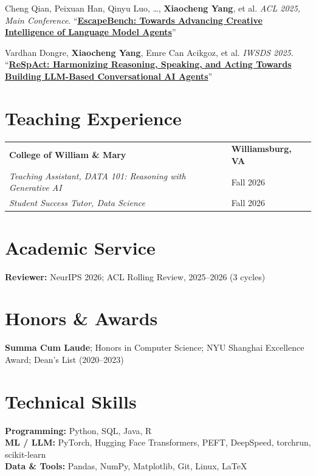 \documentclass[letterpaper]{article}
\newcommand{\pub}[4]{%
  #1 #2 ``\href{#4}{\textbf{#3}}''\par\vspace{1.8pt}
}
\begin{document}
\pub{Cheng Qian, Peixuan Han, Qinyu Luo, \ldots, \textbf{Xiaocheng Yang}, et al.}
    {\textit{ACL 2025, Main Conference}.}
    {EscapeBench: Towards Advancing Creative Intelligence of Language Model Agents}
    {https://aclanthology.org/2025.acl-long.39/}

\pub{Vardhan Dongre, \textbf{Xiaocheng Yang}, Emre Can Acikgoz, et al.}
    {\textit{IWSDS 2025}.}
    {ReSpAct: Harmonizing Reasoning, Speaking, and Acting Towards Building LLM-Based Conversational AI Agents}
    {https://aclanthology.org/2025.iwsds-1.7/}

\section{Teaching Experience}

\begin{tabularx}{\textwidth}{
  @{}>{\RaggedRight\arraybackslash}X
  >{\RaggedLeft\arraybackslash}p{1.55in}@{}
}
  \textbf{College of William \& Mary} & \textbf{Williamsburg, VA} \\[2pt]

  \textit{Teaching Assistant, DATA 101: Reasoning with Generative AI}
  & Fall 2026 \\

  \textit{Student Success Tutor, Data Science}
  & Fall 2026
\end{tabularx}

\section{Academic Service}
\textbf{Reviewer:} NeurIPS 2026; ACL Rolling Review, 2025--2026 (3 cycles)

\section{Honors \& Awards}
\textbf{Summa Cum Laude}; Honors in Computer Science; NYU Shanghai Excellence Award; Dean's List (2020--2023)

\section{Technical Skills}
\textbf{Programming:} Python, SQL, Java, R\\
\textbf{ML / LLM:} PyTorch, Hugging Face Transformers, PEFT, DeepSpeed, torchrun, scikit-learn\\
\textbf{Data \& Tools:} Pandas, NumPy, Matplotlib, Git, Linux, LaTeX
\end{document}
